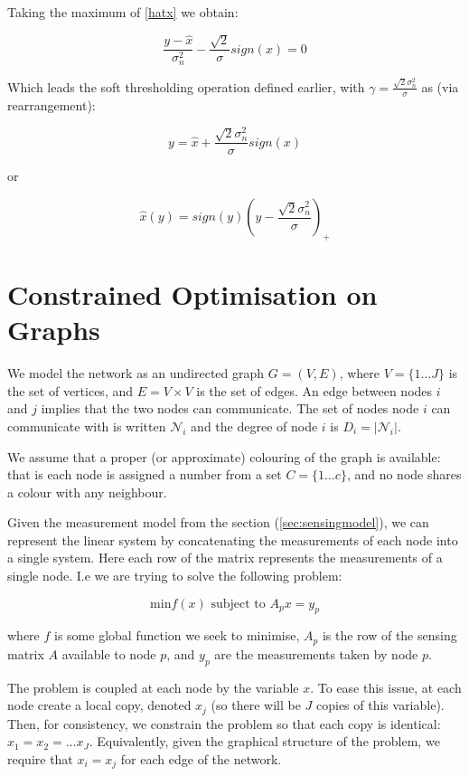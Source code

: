 \documentclass[conference]{IEEEtran}
\begin{document}
Taking the maximum of \ref{hatx} we obtain:

\begin{equation}
\frac{y-\hat{x}}{\sigma^2_n}-\frac{\sqrt{2}}{\sigma}sign(x) = 0
\end{equation}

Which leads the soft thresholding operation defined earlier, with \(\gamma = \frac{\sqrt{2}\sigma^2_n}{\sigma}\) as (via rearrangement):

$$
y =  \hat{x} + \frac{\sqrt{2}\sigma^2_n}{\sigma}sign\left(x\right)
$$

or

$$
\hat{x}\left(y\right) = sign(y)\left(y - \frac{\sqrt{2}\sigma^2_n}{\sigma}\right)_+
$$

\section{Constrained Optimisation on Graphs}
We model the network as an undirected graph \(G = \left(V,E\right)\), where \(V = \{1 \ldots J\}\) is the set of vertices, and \(E = V \times V\) is the set of edges. An edge between nodes \(i\) and \(j\) implies that the two nodes can communicate. The set of nodes node \(i\) can communicate with is written \(\mathcal{N}_i\) and the degree of node \(i\) is \(D_i = |\mathcal{N}_i|\). 

We assume that a proper (or approximate) colouring of the graph is available: that is each node is assigned a number from a set \(C = \{1 \ldots c \} \), and no node shares a colour with any neighbour.

Given the measurement model from the section (\ref{sec:sensingmodel}), we can represent the linear system by concatenating the measurements of each node into a single system. Here each row of the matrix represents the measurements of a single node. I.e we are trying to solve the following problem:

\begin{equation}
\text{min} f\left(x\right) \text{ subject to } A_p x = y_p
\end{equation}

where \(f\) is some global function we seek to minimise, \(A_p\) is the row of the sensing matrix \(A\) available to node \(p\), and \(y_p\) are the measurements taken by node \(p\).

The problem is coupled at each node by the variable \(x\). To ease this issue, at each node create a local copy, denoted \(x_j\) (so there will be \(J\) copies of this variable). Then, for consistency, we constrain the problem so that each copy is identical: \(x_1 = x_2 = \ldots x_J\). Equivalently, given the graphical structure of the problem, we require that \(x_i = x_j\) for each edge of the network.
\end{document}
